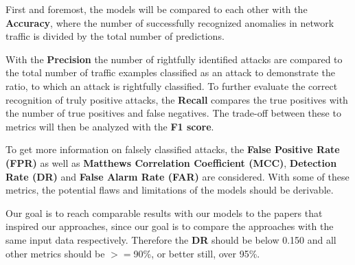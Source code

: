 \nextparagraph
First and foremost, the models will be compared to each other with the \textbf{Accuracy}, where the number of successfully recognized anomalies in network traffic is divided by the total number of predictions.

\nextparagraph
With the \textbf{Precision} the number of rightfully identified attacks are compared to the total number of traffic examples classified as an attack to demonstrate the ratio, to which an attack is rightfully classified. To further evaluate the correct recognition of truly positive attacks, the \textbf{Recall} compares the true positives with the number of true positives and false negatives. The trade-off between these to metrics will then be analyzed with the \textbf{F1 score}. 

\nextparagraph
To get more information on falsely classified attacks, the \textbf{False Positive Rate (FPR)} as well as \textbf{Matthews Correlation Coefficient (MCC)}, \textbf{Detection Rate (DR)} and \textbf{False Alarm Rate (FAR)} are considered. With some of these metrics, the potential flaws and limitations of the models should be derivable.

\nextparagraph
Our goal is to reach comparable results with our models to the papers that inspired our approaches, since our goal is to compare the approaches with the same input data respectively. Therefore the \textbf{DR} should be below 0.150 and all other metrics should be $>=$90\%, or better still, over 95\%.